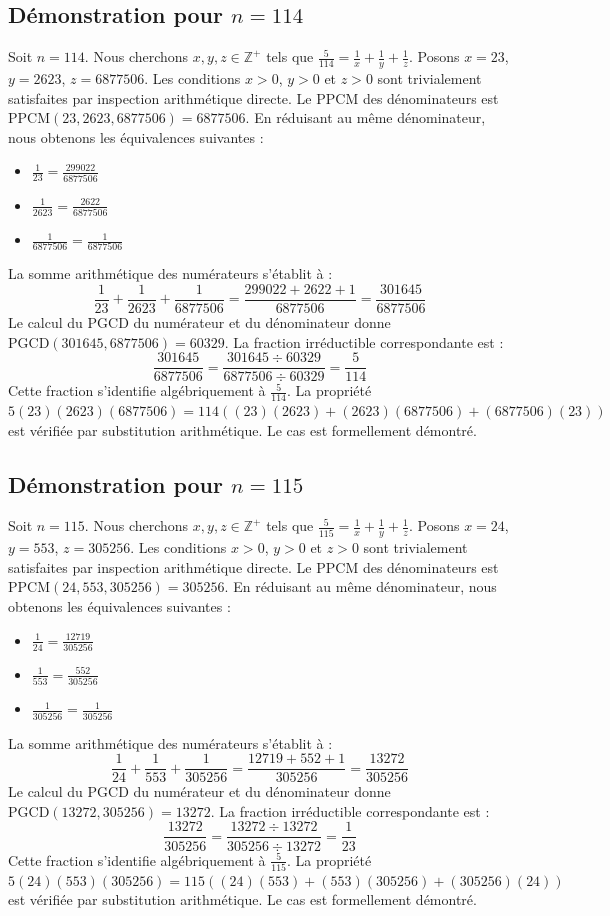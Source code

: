 \documentclass[12pt,a4paper]{article}
\begin{document}
\subsection{Démonstration pour $n = 114$}
Soit $n = 114$. Nous cherchons $x, y, z \in \mathbb{Z}^{+}$ tels que $\frac{5}{114} = \frac{1}{x} + \frac{1}{y} + \frac{1}{z}$.
Posons $x = 23$, $y = 2623$, $z = 6877506$.
Les conditions $x > 0$, $y > 0$ et $z > 0$ sont trivialement satisfaites par inspection arithmétique directe.
Le PPCM des dénominateurs est $\text{PPCM}(23, 2623, 6877506) = 6877506$.
En réduisant au même dénominateur, nous obtenons les équivalences suivantes :
\begin{itemize}
    \item $\frac{1}{23} = \frac{299022}{6877506}$
    \item $\frac{1}{2623} = \frac{2622}{6877506}$
    \item $\frac{1}{6877506} = \frac{1}{6877506}$
\end{itemize}
La somme arithmétique des numérateurs s'établit à :
$$ \frac{1}{23} + \frac{1}{2623} + \frac{1}{6877506} = \frac{299022 + 2622 + 1}{6877506} = \frac{301645}{6877506} $$
Le calcul du PGCD du numérateur et du dénominateur donne $\text{PGCD}(301645, 6877506) = 60329$.
La fraction irréductible correspondante est :
$$ \frac{301645}{6877506} = \frac{301645 \div 60329}{6877506 \div 60329} = \frac{5}{114} $$
Cette fraction s'identifie algébriquement à $\frac{5}{114}$.
La propriété $5(23)(2623)(6877506) = 114((23)(2623) + (2623)(6877506) + (6877506)(23))$ est vérifiée par substitution arithmétique.
Le cas est formellement démontré.

\subsection{Démonstration pour $n = 115$}
Soit $n = 115$. Nous cherchons $x, y, z \in \mathbb{Z}^{+}$ tels que $\frac{5}{115} = \frac{1}{x} + \frac{1}{y} + \frac{1}{z}$.
Posons $x = 24$, $y = 553$, $z = 305256$.
Les conditions $x > 0$, $y > 0$ et $z > 0$ sont trivialement satisfaites par inspection arithmétique directe.
Le PPCM des dénominateurs est $\text{PPCM}(24, 553, 305256) = 305256$.
En réduisant au même dénominateur, nous obtenons les équivalences suivantes :
\begin{itemize}
    \item $\frac{1}{24} = \frac{12719}{305256}$
    \item $\frac{1}{553} = \frac{552}{305256}$
    \item $\frac{1}{305256} = \frac{1}{305256}$
\end{itemize}
La somme arithmétique des numérateurs s'établit à :
$$ \frac{1}{24} + \frac{1}{553} + \frac{1}{305256} = \frac{12719 + 552 + 1}{305256} = \frac{13272}{305256} $$
Le calcul du PGCD du numérateur et du dénominateur donne $\text{PGCD}(13272, 305256) = 13272$.
La fraction irréductible correspondante est :
$$ \frac{13272}{305256} = \frac{13272 \div 13272}{305256 \div 13272} = \frac{1}{23} $$
Cette fraction s'identifie algébriquement à $\frac{5}{115}$.
La propriété $5(24)(553)(305256) = 115((24)(553) + (553)(305256) + (305256)(24))$ est vérifiée par substitution arithmétique.
Le cas est formellement démontré.
\end{document}

